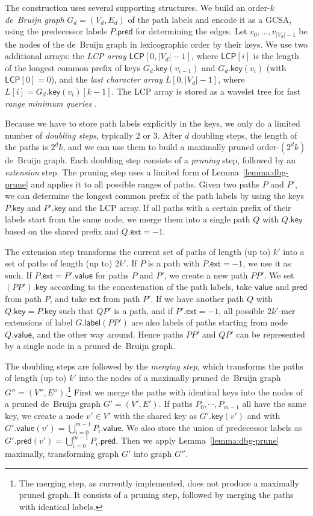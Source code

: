 \documentclass[a4paper,UKenglish]{lipics-v2016}
\newcommand{\abs}[1]{\ensuremath{\lvert #1 \rvert}}
\newcommand{\glabel}{\ensuremath{\mathsf{label}}}
\newcommand{\gpred}{\ensuremath{\mathsf{pred}}}
\newcommand{\gkey}{\ensuremath{\mathsf{key}}}
\newcommand{\gvalue}{\ensuremath{\mathsf{value}}}
\newcommand{\gext}{\ensuremath{\mathsf{ext}}}
\newcommand{\kmer}[1]{$#1$\nobreakdash-mer}
\newcommand{\orderk}[1]{order\nobreakdash-$#1$}
\newcommand{\LCP}{\ensuremath{\mathsf{LCP}}}
\begin{document}
The construction uses several supporting structures. We build an \orderk{k} \emph{de~Bruijn graph} $G_{d} = (V_{d}, E_{d})$ of the path labels and encode it as a GCSA, using the predecessor labels $P.\gpred$ for determining the edges. Let $v_{0}, \dotsc, v_{\abs{V_{d}}-1}$ be the nodes of the de~Bruijn graph in lexicographic order by their keys. We use two additional arrays: the \emph{LCP array} $\LCP[0, \abs{V_{d}}-1]$, where $\LCP[i]$ is the length of the longest common prefix of keys $G_{d}.\gkey(v_{i-1})$ and $G_{d}.\gkey(v_{i})$ (with $\LCP[0] = 0$), and the \emph{last character array} $L[0, \abs{V_{d}}-1]$, where $L[i] = G_{d}.\gkey(v_{i})[k-1]$. The LCP array is stored as a wavelet tree for fast \emph{range minimum queries} \cite{Gagie2012a}.

Because we have to store path labels explicitly in the keys, we only do a limited number of \emph{doubling steps}, typically $2$ or $3$. After $d$ doubling steps, the length of the paths is $2^{d} k$, and we can use them to build a maximally pruned \orderk{(2^{d} k)} de~Bruijn graph. Each doubling step consists of a \emph{pruning} step, followed by an \emph{extension} step. The pruning step uses a limited form of Lemma~\ref{lemma:dbg-prune} and applies it to all possible ranges of paths. Given two paths $P$ and $P'$, we can determine the longest common prefix of the path labels by using the keys $P.\gkey$ and $P'.\gkey$ and the LCP array. If all paths with a certain prefix of their labels start from the same node, we merge them into a single path $Q$ with $Q.\gkey$ based on the shared prefix and $Q.\gext = -1$.

The extension step transforms the current set of paths of length (up to) $k'$ into a set of paths of length (up to) $2k'$. If $P$ is a path with $P.\gext = -1$, we use it as such. If $P.\gext = P'.\gvalue$ for paths $P$ and $P'$, we create a new path $PP'$. We set $(PP').\gkey$ according to the concatenation of the path labels, take $\gvalue$ and $\gpred$ from path $P$, and take $\gext$ from path $P'$. If we have another path $Q$ with $Q.\gkey = P.\gkey$ such that $QP'$ is a path, and if $P'.\gext = -1$, all possible \kmer{2k'} extensions of label $G.\glabel(PP')$ are also labels of paths starting from node $Q.\gvalue$, and the other way around. Hence paths $PP'$ and $QP'$ can be represented by a single node in a pruned de~Bruijn graph.

The doubling steps are followed by the \emph{merging step}, which transforms the paths of length (up to) $k'$ into the nodes of a maximally pruned de~Bruijn graph $G'' = (V'', E'')$.\footnote{The merging step, as currently implemented, does not produce a maximally pruned graph. It consists of a pruning step, followed by merging the paths with identical labels.} First we merge the paths with identical keys into the nodes of a pruned de~Bruijn graph $G' = (V', E')$. If paths $P_{0}, \dotsm, P_{m-1}$ all have the same key, we create a node $v' \in V'$ with the shared key as $G'.\gkey(v')$ and with $G'.\gvalue(v') = \bigcup_{i=0}^{m-1} P_{i}.\gvalue$. We also store the union of predecessor labels as $G'.\gpred(v') = \bigcup_{i=0}^{m-1} P_{i}.\gpred$. Then we apply Lemma~\ref{lemma:dbg-prune} maximally, transforming graph $G'$ into graph $G''$.
\end{document}
